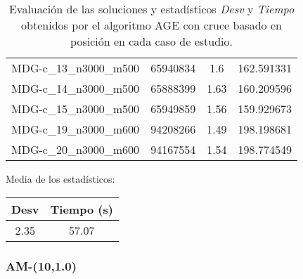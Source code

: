 \documentclass{article}
\begin{document}
\begin{table}[H]
\begin{tabular}{|cccc|}
		MDG-c\_13\_n3000\_m500 & 65940834 & 1.6 & 162.591331\\
		MDG-c\_14\_n3000\_m500 & 65888399 & 1.63 & 160.209596\\
		MDG-c\_15\_n3000\_m500 & 65949859 & 1.56 & 159.929673\\
		MDG-c\_19\_n3000\_m600 & 94208266 & 1.49 & 198.198681\\
		MDG-c\_20\_n3000\_m600 & 94167554 & 1.54 & 198.774549\\
		\hline
	\end{tabular}
	\caption{Evaluación de las soluciones y estadísticos \emph{Desv} y \emph{Tiempo} obtenidos por el algoritmo AGE con cruce basado en posición
		en cada caso de estudio.}
	\label{tab:age-posicion}
\end{table}

Media de los estadísticos:
\begin{table}[H]
	\centering
	\begin{tabular}{|cc|}
		\hline
		Desv & Tiempo (s)\\ \hline
		2.35 & 57.07 \\
		\hline
	\end{tabular}
\end{table}

\pagebreak

\subsubsection*{AM-(10,1.0)}
\end{document}
